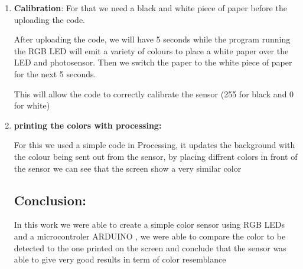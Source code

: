 \documentclass[12pt,a4paper]{report}
\begin{document}
\begin{enumerate}
\item \textbf{Calibration}:
For that we need a black and white piece of paper before the uploading the code.

After uploading the code, we will have 5 seconds while the program running the RGB LED will emit a variety of colours to place a white paper over the LED and photosensor. Then we switch the paper to the white piece of paper for the next 5 seconds.

This will allow the code to correctly calibrate the sensor (255 for black and 0 for white)

\item \textbf{printing the colors with processing:}

For this we used a simple code  in Processing, it updates the background with the colour being sent out from the sensor, by placing diffrent colors in front of the sensor we can see that the screen show a very similar color


\subsection{Conclusion:}
In this work we were able to create a simple color sensor using RGB LEDs and a microcontroler ARDUINO , we were able to compare the color to be detected to the one printed on the screen and conclude that the sensor was able to give very good results in term of color resemblance 






\end{enumerate}
\end{document}
